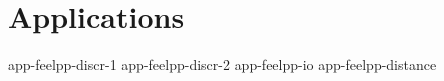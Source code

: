 \chapter{Applications}
\label{chap:applications}

{app-feelpp-discr-1}
{app-feelpp-discr-2}
{app-feelpp-io}
{app-feelpp-distance}

